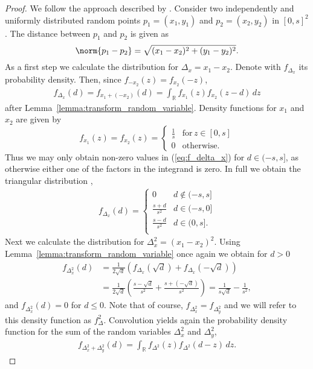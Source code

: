 \begin{proof}
  We follow the approach described by \textcite{Moltchanov2012}.
  Consider two independently and uniformly distributed random points
  $p_1 = (x_1,y_1)$ and $p_2 = (x_2,y_2)$ in $[0,s]^2$. The distance
  between $p_1$ and $p_2$ is given as
  \[
    \norm{p_1 - p_2} = \sqrt{(x_1 - x_2)^2 + (y_1 - y_2)^2}.
  \]
  As a first step we calculate the distribution for $\Delta_x = x_1 -
  x_2$. 
  Denote with $f_{\Delta_x}$ its probability density. Then, since
  $f_{-x_2}(z) = f_{x_2}(-z)$,
  \begin{align}\label{eq:f_delta_x}
    f_{\Delta_x}(d) = f_{x_1 + (-x_2)}(d) = \int_{\mathbb{R}}  f_{x_1}(z)
    f_{x_2}(z-d)\, dz
  \end{align}
  after Lemma~\ref{lemma:transform_random_variable}.  %
  Density functions for $x_1$ and $x_2$ are given by
  \[
    f_{x_1}(z) = f_{x_2}(z) = %
    \begin{cases} 
      \frac{1}{s} & \mathrm{for} \, z \in  [0,s] \\
      0           & \mathrm{otherwise}.
    \end{cases}
  \] 
  Thus we may only obtain non-zero values in (\ref{eq:f_delta_x}) for $d
  \in (-s,s]$, as otherwise either one of the factors in the integrand
  is zero. In full we obtain the triangular distribution \parencite{Simpson1755},
  \begin{align*}
    f_{\Delta_x}(d) =  \begin{cases}
                         0 & d \notin (-s,s] \\
                         \frac{s+d}{s^2} & d \in (-s,0] \\
                         \frac{s-d}{s^2} & d \in (0,s].\\
                       \end{cases}
  \end{align*}  
  Next we calculate the distribution for $\Delta_x^2 =
  (x_1-x_2)^2$. Using Lemma~\ref{lemma:transform_random_variable} once
  again we obtain for $d>0$
  \begin{align*}
    f_{\Delta_x^2}(d) & = \frac{1}{2\sqrt{d}}
    \left(f_{\Delta_x}(\sqrt{d}) + f_{\Delta_x}(-\sqrt{d})\right) \\
    & = \frac{1}{2\sqrt{d}} \left(\frac{s-\sqrt{d}}{s^2} +
      \frac{s+\left(-\sqrt{d}\right)}{s^2}\right) = \frac{1}{s\sqrt{d}} - \frac{1}{s^2},
  \end{align*}
  and $f_{\Delta_x^2}(d) = 0$ for $d \leq 0$. Note that of course,
  $f_{\Delta_x^2} = f_{\Delta_y^2}$ and we will refer to this density
  function as $f_\Delta^2$. Convolution yields again the probability
  density function for the sum of the random variables $\Delta_x^2$
  and $\Delta_y^2$,
  \begin{align*}%
    f_{\Delta_x^2 + \Delta_y^2}(d) = \int_{\mathbb{R}} f_{\Delta^2}(z)
    f_{\Delta^2}(d-z)\, dz.
  \end{align*}


\end{proof}
